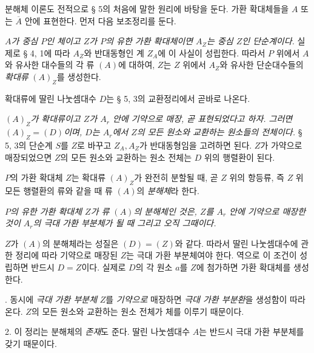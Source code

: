 \noindent\textbf{}\quad 분해체 이론도 전적으로 § 5의 처음에 말한 원리에 바탕을 둔다. 가환 확대체들을 \(A\) 또는 \(\overline A\) 안에 표현한다. 먼저 다음 보조정리를 둔다.

\medskip
\noindent\textbf{} \emph{\(A\)가 중심 \(P\)인 체이고 \(Z\)가 \(P\)의 유한 가환 확대체이면 \(A_Z\)는 중심 \(Z\)인 단순계이다.} 실제로 § 4, 1에 따라 \(A_Z\)와 반대동형인 계 \(Z_A\)에 이 사실이 성립한다. 따라서 \(P\) 위에서 \(A\)와 유사한 대수들의 각 류 \((A)\)에 대하여, \(Z\)는 \(Z\) 위에서 \(A_Z\)와 유사한 단순대수들의 \emph{확대류} \((A)_Z\)를 생성한다.

확대류에 딸린 나눗셈대수 \(D\)는 § 5, 3의 교환정리에서 곧바로 나온다.

\noindent\textbf{} \emph{\((A)_Z\)가 확대류이고 \(Z\)가 \(A_r\) 안에 기약으로 매장, 곧 표현되었다고 하자. 그러면 \((A)_Z=(D)\)이며, \(D\)는 \(A_r\)에서 \(Z\)의 모든 원소와 교환하는 원소들의 전체이다.} § 5, 3의 단순계 \(S\)를 \(Z\)로 바꾸고 \(Z_A,A_Z\)가 반대동형임을 고려하면 된다. \(Z\)가 가약으로 매장되었으면 \(Z\)의 모든 원소와 교환하는 원소 전체는 \(D\) 위의 행렬환이 된다.

\(P\)의 가환 확대체 \(Z\)는 확대류 \((A)_Z\)가 완전히 분할될 때, 곧 \(Z\) 위의 항등류, 즉 \(Z\) 위 모든 행렬환의 류와 같을 때 류 \((A)\)의 \emph{분해체}라 한다.

\noindent\textbf{}
\emph{\(P\)의 유한 가환 확대체 \(Z\)가 류 \((A)\)의 분해체인 것은, \(Z\)를 \(A_r\) 안에 기약으로 매장한 것이 \(A_r\)의 극대 가환 부분체가 될 때 그리고 오직 그때이다.}

\(Z\)가 \((A)\)의 분해체라는 성질은 \((D)=(Z)\)와 같다. 따라서 딸린 나눗셈대수에 관한 정리에 따라 기약으로 매장된 \(Z\)는 극대 가환 부분체여야 한다. 역으로 이 조건이 성립하면 반드시 \(D=Z\)이다. 실제로 \(D\)의 각 원소 \(a\)를 \(Z\)에 첨가하면 가환 확대체를 생성한다.

\noindent\textbf{}. 동시에 \emph{극대 가환 부분체} \(Z\)를 \emph{기약으로} 매장하면 \emph{극대 가환 부분환}을 생성함이 따라온다. \(Z\)의 모든 원소와 교환하는 원소 전체가 체를 이루기 때문이다.

2. 이 정리는 분해체의 \emph{존재}도 준다. 딸린 나눗셈대수 \(A\)는 반드시 극대 가환 부분체를 갖기 때문이다.

